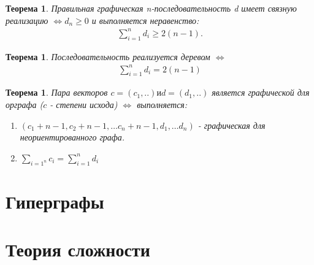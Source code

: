 \documentclass[a4paper,openany]{book}
\newcounter{TheoremCounter}
\newtheorem{theorem}[TheoremCounter]{Теорема}
\begin{document}
\begin{theorem}
  Правильная графическая n-последовательность d имеет связную реализацию
  $\Leftrightarrow d_n \geqslant 0$ и выполняется неравенство:
  \begin{align*}
    \sum_{i = 1}^n d_i \geqslant 2(n - 1).
  \end{align*}
\end{theorem}

\begin{theorem}
  Последовательность реализуется деревом $\Leftrightarrow$
  \begin{align*}
    \sum_{i = 1}^n d_i = 2(n - 1)
  \end{align*}
\end{theorem}

\begin{theorem}
  Пара векторов $c = (c_1, ..) и d = (d_1, ..)$ является графической для орграфа
  ($c$ - степени исхода) $\Leftrightarrow$ выполняется:
  \begin{enumerate}
    \item $(c_1 + n - 1, c_2 + n - 1, … c_n + n - 1, d_1, … d_n)$ - графическая
    для неориентированного графа.
    \item $\sum_{i = 1^n}c_i = \sum_{i = 1}^n d_i$
  \end{enumerate}
\end{theorem}

\chapter{Гиперграфы}
 
\chapter{Теория сложности}
\end{document}
